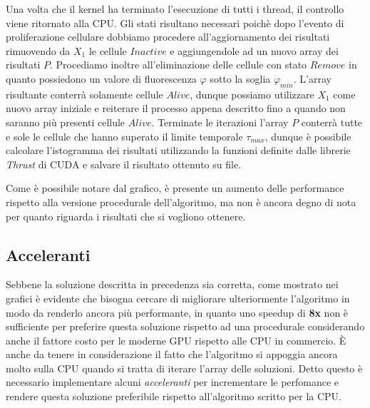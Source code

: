 Una volta che il kernel ha terminato l'esecuzione di tutti i thread, il
controllo viene ritornato alla CPU.
Gli stati risultano necessari poichè dopo l'evento di proliferazione cellulare
dobbiamo procedere all'aggiornamento dei risultati rimuovendo
da $X_{1}$ le cellule $Inactive$ e aggiungendole ad un nuovo array dei
risultati $P$.
Procediamo inoltre all'eliminazione delle cellule con stato $Remove$ in quanto
possiedono un valore di fluorescenza $\varphi$ sotto la soglia $\varphi_{min}$.
L'array risultante conterrà solamente cellule $Alive$, dunque possiamo
utilizzare $X_{1}$ come nuovo array iniziale e reiterare
il processo appena descritto fino a quando non saranno più presenti cellule
$Alive$.
Terminate le iterazioni l'array $P$ conterrà tutte e sole le cellule che hanno
superato il limite temporale $\tau_{max}$, dunque è possibile calcolare
l'istogramma dei risultati utilizzando la funzioni definite dalle librerie
\textit{Thrust}\cite{bell2011thrust} di CUDA e salvare il risultato ottenuto
su file.

\begin{figure}[H]
    \centering
    \caption{}
\end{figure}

Come è possibile notare dal grafico, è presente un aumento delle performance
rispetto alla versione procedurale dell'algoritmo, ma non è ancora degno
di nota per quanto riguarda i risultati che si vogliono ottenere.

\subsection{Acceleranti}

Sebbene la soluzione descritta in precedenza sia corretta, come mostrato nei
grafici è evidente che bisogna cercare di migliorare ulteriormente
l'algoritmo in modo da renderlo ancora più performante, in quanto uno
speedup di \textbf{8x} non è sufficiente per preferire questa soluzione
rispetto ad una procedurale considerando anche il fattore costo per le moderne
GPU rispetto alle CPU in commercio.
È anche da tenere in considerazione il fatto che l'algoritmo si appoggia
ancora molto sulla CPU quando si tratta di iterare l'array delle soluzioni.
Detto questo è necessario implementare alcuni \textit{acceleranti} per
incrementare le perfomance e rendere questa soluzione preferibile rispetto
all'algoritmo scritto per la CPU.

